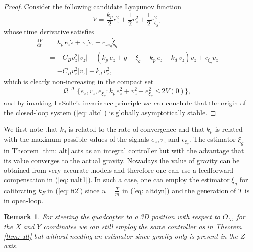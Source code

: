 \documentclass[a4paper, onecolumn]{ieeeconf}
\newcommand{\dfb}{\stackrel{\Delta}{=}}
\newtheorem{remark}[theorem]{Remark}
\begin{document}
\begin{proof}
Consider the following candidate Lyapunov function
\begin{equation}
	V = \frac{k_p}{2}e_z^2 + \frac{1}{2}v_z^2 + \frac{1}{2}e_{\xi_g}^2,
\end{equation}
whose time derivative satisfies
\begin{align}
	\frac{\mathrm{d}V}{\mathrm{d}t} &= k_p\,e_z\dot z + v_z\dot v_z + e_{xi_g}\dot \xi_g \nonumber \\
 &= -C_Dv_z^2|v_z| + (k_p\,e_z + g -\xi_g -k_p\,e_z - k_d\,v_z)v_z + e_{\xi_g}v_z \nonumber \\
 &= -C_Dv_z^2|v_z| - k_d\,v_z^2,
\end{align}
which is clearly non-increasing in the compact set
\begin{equation}
	\mathcal{Q} \dfb \Big\{e_z, v_z, e_{\xi_g} : k_p\,e_z^2 + v_z^2 + e_{\xi_g}^2 \leq 2V(0) \Big\},
\end{equation}
and by invoking LaSalle's invariance principle we can conclude that the origin of the closed-loop system (\ref{eq: altcl}) is globally asymptotically stable.
\end{proof}
We first note that $k_d$ is related to the rate of convergence and that $k_p$ is related with the maximum possible values of the signals $e_z, v_z$ and $e_{\xi_g}$. The estimator $\xi_g$ in Theorem \ref{thm: alt} acts as an integral controller but with the advantage that its value converges to the actual gravity. Nowadays the value of gravity can be obtained from very accurate models \cite{wsg84g} and therefore one can use a feedforward compensation in (\ref{eq: ualt1}). In such a case, one can employ the estimator $\xi_g$ for calibrating $k_F$ in (\ref{eq: fi2}) since $u=\frac{T}{m}$ in (\ref{eq: altdyn}) and the generation of $T$ is in open-loop. 

\begin{remark}
For steering the quadcopter to a 3D position with respect to $O_N$, for the $X$ and $Y$ coordinates we can still employ the same controller as in Theorem \ref{thm: alt} but without needing an estimator since gravity only is present in the $Z$ axis.
\end{remark}
\end{document}
